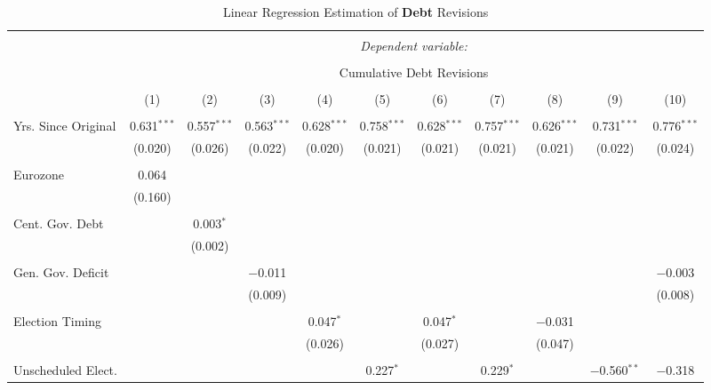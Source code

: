 
\begin{table}[!htbp] \centering 
  \caption{Linear Regression Estimation of \textbf{Debt} Revisions} 
  \label{debt_results} 
\tiny 
\begin{tabular}{@{\extracolsep{5pt}}lcccccccccc} 
\\[-1.8ex]\hline 
\hline \\[-1.8ex] 
 & \multicolumn{10}{c}{\textit{Dependent variable:}} \\ 
\cline{2-11} 
\\[-1.8ex] & \multicolumn{10}{c}{Cumulative Debt Revisions} \\ 
\\[-1.8ex] & (1) & (2) & (3) & (4) & (5) & (6) & (7) & (8) & (9) & (10)\\ 
\hline \\[-1.8ex] 
 Yrs. Since Original & 0.631$^{***}$ & 0.557$^{***}$ & 0.563$^{***}$ & 0.628$^{***}$ & 0.758$^{***}$ & 0.628$^{***}$ & 0.757$^{***}$ & 0.626$^{***}$ & 0.731$^{***}$ & 0.776$^{***}$ \\ 
  & (0.020) & (0.026) & (0.022) & (0.020) & (0.021) & (0.021) & (0.021) & (0.021) & (0.022) & (0.024) \\ 
  & & & & & & & & & & \\ 
 Eurozone & 0.064 &  &  &  &  &  &  &  &  &  \\ 
  & (0.160) &  &  &  &  &  &  &  &  &  \\ 
  & & & & & & & & & & \\ 
 Cent. Gov. Debt &  & 0.003$^{*}$ &  &  &  &  &  &  &  &  \\ 
  &  & (0.002) &  &  &  &  &  &  &  &  \\ 
  & & & & & & & & & & \\ 
 Gen. Gov. Deficit &  &  & $-$0.011 &  &  &  &  &  &  & $-$0.003 \\ 
  &  &  & (0.009) &  &  &  &  &  &  & (0.008) \\ 
  & & & & & & & & & & \\ 
 Election Timing &  &  &  & 0.047$^{*}$ &  & 0.047$^{*}$ &  & $-$0.031 &  &  \\ 
  &  &  &  & (0.026) &  & (0.027) &  & (0.047) &  &  \\ 
  & & & & & & & & & & \\ 
 Unscheduled Elect. &  &  &  &  & 0.227$^{*}$ &  & 0.229$^{*}$ &  & $-$0.560$^{**}$ & $-$0.318 \\ 

\end{tabular}
\end{table}
